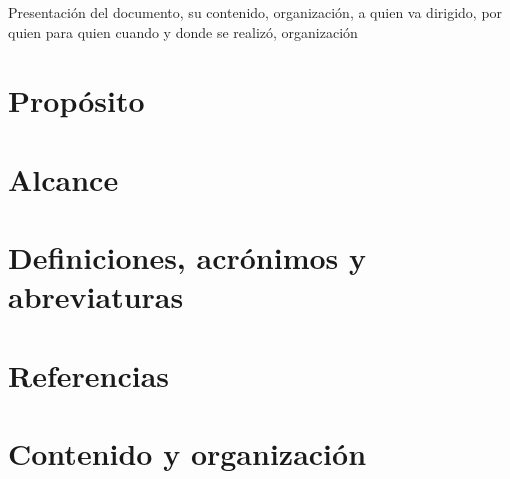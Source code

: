 
Presentación del documento, su contenido, organización, a quien va dirigido, por quien para quien cuando y donde se realizó, organización 

\section{Propósito}


\section{Alcance}


\section{Definiciones, acrónimos y abreviaturas}

\section{Referencias}

\section{Contenido y organización}
